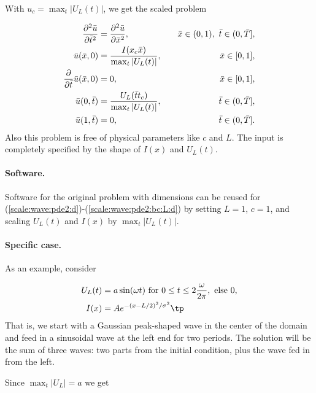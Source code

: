 \documentclass[graybox,envcountchap,sectrefs,final]{svmonodo}
\begin{document}
With $u_c=\max_t |U_L(t)|$, we get the scaled problem

\begin{align}
\frac{\partial^2 \bar u}{\partial \bar t^2} &=
{\partial^2 \bar u\over\partial \bar x^2},
\quad & \bar x\in (0,1),\ \bar t\in (0,\bar T],
\label{scale:wave:pde2:d}\\ 
\bar u(\bar x,0) &= \frac{I(x_c\bar x)}{\max_t |U_L(t)|},
\quad &\bar x\in [0,1],
\label{scale:wave:pde2:ic:u:d}\\ 
{\partial\over\partial \bar t}\bar u(\bar x,0) &= 0,
\quad & \bar x\in [0,1],
\label{scale:wave:pde2:ic:ut:d}\\ 
\bar u(0,\bar t) & = \frac{U_L(\bar tt_c)}{\max_t |U_L(t)|},
\quad  &\bar t\in (0,\bar T],
\label{scale:wave:pde2:bc:0:d}\\ 
\bar u(1,\bar t) & = 0,
\quad &\bar t\in (0,\bar T].
\label{scale:wave:pde2:bc:L:d}
\end{align}
Also this problem is free of physical parameters like $c$ and $L$.
The input is completely specified by the shape of $I(x)$ and $U_L(t)$.

\paragraph{Software.}
Software for the original problem with dimensions can be reused for
(\ref{scale:wave:pde2:d})-(\ref{scale:wave:pde2:bc:L:d}) by
setting $L=1$, $c=1$, and scaling $U_L(t)$ and $I(x)$ by
$\max_t |U_L(t)|$.

\paragraph{Specific case.}
As an example, consider

\begin{align*}
U_L(t) &= a\sin(\omega t)\hbox{ for } 0\leq t\leq 2\frac{\omega}{2\pi},
\hbox{ else } 0,\\ 
I(x)   & = Ae^{-(x-L/2)^2/\sigma^2}\tp
\end{align*}
That is, we start with a Gaussian peak-shaped wave in the center of the
domain and feed in a sinusoidal wave at the left end for two periods.
The solution will be the sum of three waves: two parts from the initial
condition, plus the wave fed in from the left.

Since $\max_t |U_L|=a$ we get
\end{document}
